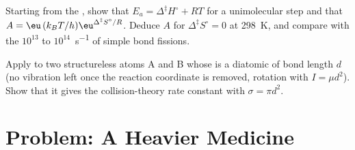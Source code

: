 \begin{exercise}[$\star\star\star$]\label{exo:b3:rate-theories:11}
Starting from the , show that $E_a = \Delta^{\ddagger}H^\circ + RT$ for a
unimolecular step and that $A = \eu\,(k_BT/h)\eu^{\Delta^{\ddagger}S^\circ/R}$. Deduce $A$ for $\Delta^{\ddagger}S^\circ = 0$ at
\qty{298}{K}, and compare with the $10^{13}$ to $10^{14}$~\unit{s^{-1}} of simple bond fissions.
\end{exercise}

\begin{exercise}[$\star\star\star$]\label{exo:b3:rate-theories:12}
Apply  to two structureless atoms A and B whose  is a diatomic of bond length $d$ (no vibration left once the reaction
coordinate is removed, rotation with $I = \mu d^2$). Show that it gives the
collision-theory rate constant with $\sigma = \pi d^2$.
\end{exercise}

\section{Problem: A Heavier Medicine}

